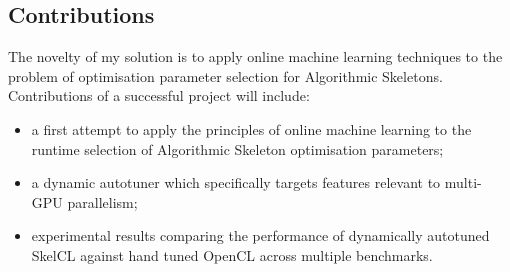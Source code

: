 \subsection{Contributions}

The novelty of my solution is to apply online machine learning
techniques to the problem of optimisation parameter selection for
Algorithmic Skeletons. Contributions of a successful project will
include:

\begin{itemize}
\item a first attempt to apply the principles of online machine
  learning to the runtime selection of Algorithmic Skeleton
  optimisation parameters;
\item a dynamic autotuner which specifically targets features relevant
  to multi-GPU parallelism;
\item experimental results comparing the performance of dynamically
  autotuned SkelCL against hand tuned OpenCL across multiple
  benchmarks.
\end{itemize}

